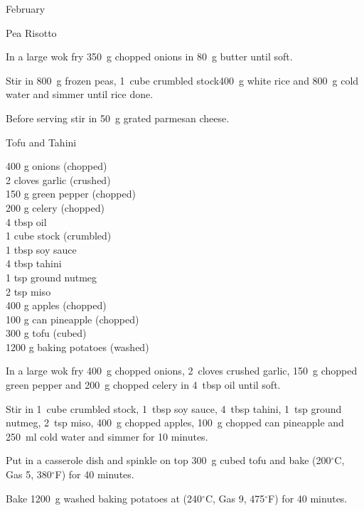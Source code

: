 \begin{menu}{February}
\begin{recipe}{2}{Pea Risotto}
	
    \begin{instructions}
    \item 
        In a large wok fry
        350~g chopped onions
        in
        80~g  butter
        until soft.
      \item 
        Stir in
        800~g  frozen peas,
        1~cube crumbled stock400~g  white rice
        and
        800~g  cold water
        and simmer until rice done.
      \item 
        Before serving stir in
        50~g grated parmesan cheese.
      
    \end{instructions}
    \end{recipe}%
  
    \begin{recipe}{2}{Tofu and Tahini}%
		\begin{ingredients}
		400 g onions (chopped) \\
	2 cloves garlic (crushed) \\
	150 g green pepper (chopped) \\
	200 g celery (chopped) \\
	4 tbsp oil  \\
	1 cube stock (crumbled) \\
	1 tbsp soy sauce  \\
	4 tbsp tahini  \\
	1 tsp ground nutmeg  \\
	2 tsp miso  \\
	400 g apples (chopped) \\
	100 g can pineapple (chopped) \\
	300 g tofu (cubed) \\
	1200 g baking potatoes (washed) \\
	
		\end{ingredients}
	
	
    \begin{instructions}
    \item 
        In a large wok fry
        400~g chopped onions,
        2~cloves crushed garlic,
        150~g chopped green pepper
        and
        200~g chopped celery
        in
        4~tbsp  oil
        until soft.
      \item 
        Stir in
        1~cube crumbled stock,
        1~tbsp  soy sauce,
        4~tbsp  tahini,
        1~tsp  ground nutmeg,
        2~tsp  miso,
        400~g chopped apples,
        100~g chopped can pineapple
        and
        250~ml  cold water
        and simmer for 10 minutes.
      \item 
        Put in a casserole dish
        and spinkle on top
        300~g cubed tofu
        and bake (200$^{\circ}$C, Gas 5, 380$^{\circ}$F) for 40 minutes.
      \item 
    Bake
    1200~g washed baking potatoes
    at
    (240$^{\circ}$C, Gas 9, 475$^{\circ}$F) for 40 minutes.
  

\end{instructions}
\end{recipe}
\end{menu}
